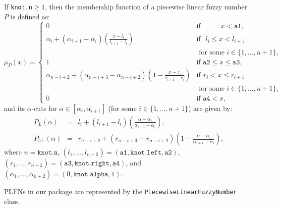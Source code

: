 \documentclass[11pt]{article}\usepackage{graphicx, color}
\begin{document}
If \texttt{knot.n}$\ge 1$, then the membership function of
a piecewise linear fuzzy number $P$ is defined as:
\begin{equation}
\mu_P(x) = \left\{\begin{array}{ll}
0 & \text{if } \phantom{\mathtt{a2}\le\ } x<\mathtt{a1}, \\
\alpha_i+(\alpha_{i+1}-\alpha_i) \left(\frac{x-l_i}{l_{i+1}-l_i}\right)  & \text{if }\ \, l_i \le x < l_{i+1}\\
& \text{ for some } i\in\{1,\dots,n+1\}, \\
1 & \text{if } \mathtt{a2}\le x\le\mathtt{a3}, \\
\alpha_{n-i+2}+(\alpha_{n-i+3}-\alpha_{n-i+2}) \left(1-\frac{x-r_i}{r_{i+1}-r_i}\right)  & \text{if}\ \, r_i < x \le r_{i+1} \\
& \text{ for some } i\in\{1,\dots,n+1\}, \\
0 & \text{if } \mathtt{a4}<x,
\end{array}\right.
\end{equation}
and its $\alpha$-cuts for $\alpha\in[\alpha_i, \alpha_{i+1}]$
(for some $i\in\{1,\dots,n+1\}$) are given by:
\begin{eqnarray}
P_L(\alpha) & = & l_i+(l_{i+1}-l_i)\left(\frac{\alpha-\alpha_i}{\alpha_{i+1}-\alpha_i}\right), \\
P_U,(\alpha) & = & r_{n-i+2}+(r_{n-i+3}-r_{n-i+2})\left(1-\frac{\alpha-\alpha_i}{\alpha_{i+1}-\alpha_i}\right),
\end{eqnarray}
where $n=\mathtt{knot.n}$, $(l_1,\dots,l_{n+2}) = (\mathtt{a1},\mathtt{knot.left},\mathtt{a2})$,
$(r_1,\dots,r_{n+2}) = (\mathtt{a3},\mathtt{knot.right},\mathtt{a4})$,
and $(\alpha_1,\dots,\alpha_{n+2})=(0,\mathtt{knot.alpha},1)$.

\bigskip
PLFNs in our package are represented by the \texttt{PiecewiseLinearFuzzyNumber} class.
\end{document}

